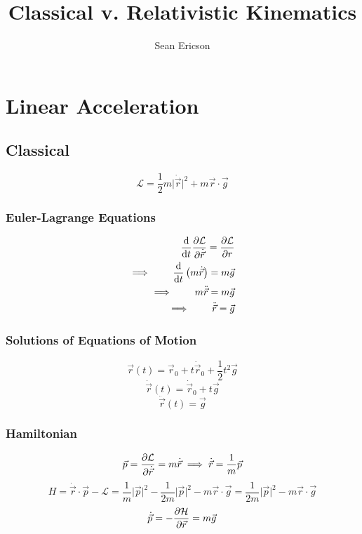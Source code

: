 \documentclass[12pt]{article}
\newcommand{\magsq}[1]{\big|#1\big|^2}
\newcommand{\Lag}{\mathcal{L}}
\newcommand{\Ham}{\mathcal{H}}
\newcommand{\pos}{\vec{r}}
\newcommand{\vel}{\dot{\vec{r}}}
\newcommand{\acc}{\ddot{\vec{r}}}
\newcommand{\mom}{\vec{p}}
\begin{document}
	
\title{Classical v. Relativistic Kinematics}
\author{Sean Ericson}
\maketitle

\section{Linear Acceleration}
\subsection*{Classical}
\[ \Lag = \frac{1}{2}m\magsq{\vel} + m\pos\cdot\vec{g}  \]

\subsubsection*{Euler-Lagrange Equations}
\begin{align*}
    \dv{t}\pdv{\Lag}{\vel} = \pdv{\Lag}{r} \\
    \implies\qquad \dv{t}\left(m\vel\right) = m\vec{g} \\
    \implies\qquad  m\acc = m\vec{g} \\
    \implies\qquad \acc = \vec{g}
\end{align*}

\subsubsection*{Solutions of Equations of Motion}
\[ \pos(t) = \pos_0 + t\vel_0+ \frac{1}{2}t^2\vec{g} \]
\[ \vel(t) = \vel_0 + t\vec{g} \]
\[ \acc(t) = \vec{g} \]

\subsubsection*{Hamiltonian}
\[ \mom = \pdv{\Lag}{\vel} = m\vel \implies \vel = \frac{1}{m}\mom \]
\[ H = \vel\cdot\mom - \Lag = \frac{1}{m}\magsq{\mom} - \frac{1}{2m}\magsq{\mom} - m\pos\cdot\vec{g} = \frac{1}{2m}\magsq{\mom} - m\pos\cdot\vec{g} \]
\[ \dot{\mom} = -\pdv{\Ham}{\pos} = m\vec{g} \]
\end{document}
